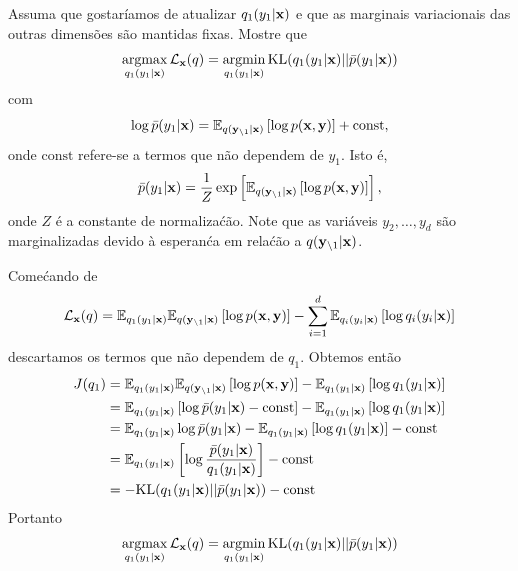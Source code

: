 \begin{exenumerate}
\begin{solution}
    \end{solution}
    
    \item Assuma que gostar\'iamos de atualizar $q_1(y_1 |\mathbf{x})$ e que as
    marginais variacionais das outras dimens\~oes s\~ao mantidas fixas. Mostre que
    \begin{equation}
        \operatorname*{\mathrm{argmax}}_{q_1(y_1|\mathbf{x})} \mathcal{L}_{\mathbf{x}}(q) = \operatorname*{\mathrm{argmin}}_{q_1(y_1|\mathbf{x})} \text{KL}(q_1(y_1|\mathbf{x}) || \bar{p}(y_1|\mathbf{x}))
    \end{equation}
    com
    \begin{equation}
        \log \bar{p}(y_1|\mathbf{x}) = \mathbb{E}_{q(\mathbf{y}_{\setminus 1}|\mathbf{x})}\left[ \log p(\mathbf{x},\mathbf{y})\right] + \text{const},
    \end{equation}
    onde $\text{const}$ refere-se a termos que n\~ao dependem de $y_1$. Isto \'e,
    \begin{equation}
        \bar{p}(y_1|\mathbf{x}) = \frac{1}{Z} \exp\left[ \mathbb{E}_{q(\mathbf{y}_{\setminus
                1}|\mathbf{x})}\left[ \log p(\mathbf{x},\mathbf{y})\right] \right],
    \end{equation}
    onde $Z$ \'e a constante de normaliza\'c\~ao. Note que as vari\'aveis $y_2, \ldots, y_d$
    s\~ao marginalizadas devido \`a esperan\'ca em rela\'c\~ao a $q(\mathbf{y}_{\setminus
        1}|\mathbf{x})$.
    
    \begin{solution}
        Come\'cando de 
        \begin{equation}
            \mathcal{L}_{\mathbf{x}}(q) = \mathbb{E}_{q_1(y_1|\mathbf{x})} \mathbb{E}_{q(\mathbf{y}_{\setminus 1}|\mathbf{x})}\left[ \log p(\mathbf{x},\mathbf{y})\right] - \sum_{i=1}^d \mathbb{E}_{q_i(y_i|\mathbf{x})} \left[\log q_i(y_i|\mathbf{x})\right]
        \end{equation}
        descartamos os termos que n\~ao dependem de $q_1$. Obtemos ent\~ao
        \begin{align}
            J(q_1) & =  \mathbb{E}_{q_1(y_1|\mathbf{x})} \mathbb{E}_{q(\mathbf{y}_{\setminus 1}|\mathbf{x})}\left[ \log p(\mathbf{x},\mathbf{y})\right] -  \mathbb{E}_{q_1(y_1|\mathbf{x})} \left[\log q_1(y_1|\mathbf{x})\right]\\
            & =  \mathbb{E}_{q_1(y_1|\mathbf{x})} \left[\log \bar{p}(y_1|\mathbf{x}) - \text{const} \right]- \mathbb{E}_{q_1(y_1|\mathbf{x})} \left[\log q_1(y_1|\mathbf{x})\right]\\
            & = \mathbb{E}_{q_1(y_1|\mathbf{x})} \log \bar{p}(y_1|\mathbf{x}) - \mathbb{E}_{q_1(y_1|\mathbf{x})} \left[\log q_1(y_1|\mathbf{x})\right] - \text{const}\\
            & = \mathbb{E}_{q_1(y_1|\mathbf{x})}\left[ \log \frac{\bar{p}(y_1|\mathbf{x})}{ q_1(y_1|\mathbf{x})} \right] - \text{const}\\
            & = -\text{KL}( q_1(y_1|\mathbf{x}) || \bar{p}(y_1|\mathbf{x}) ) - \text{const}
        \end{align}
        Portanto
        \begin{equation}
            \operatorname*{\mathrm{argmax}}_{q_1(y_1|\mathbf{x})} \mathcal{L}_{\mathbf{x}}(q) = \operatorname*{\mathrm{argmin}}_{q_1(y_1|\mathbf{x})} \text{KL}(q_1(y_1|\mathbf{x}) || \bar{p}(y_1|\mathbf{x}))
        \end{equation}
        

\end{solution}
\end{exenumerate}
